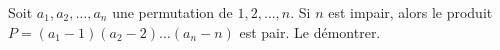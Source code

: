 Soit $a_1, a_2, \ldots, a_n$ une permutation de $1, 2, \ldots, n$. Si $n$ est impair, alors le produit $P = (a_1 - 1)(a_2 - 2) \ldots (a_n - n)$ est pair. Le démontrer.
